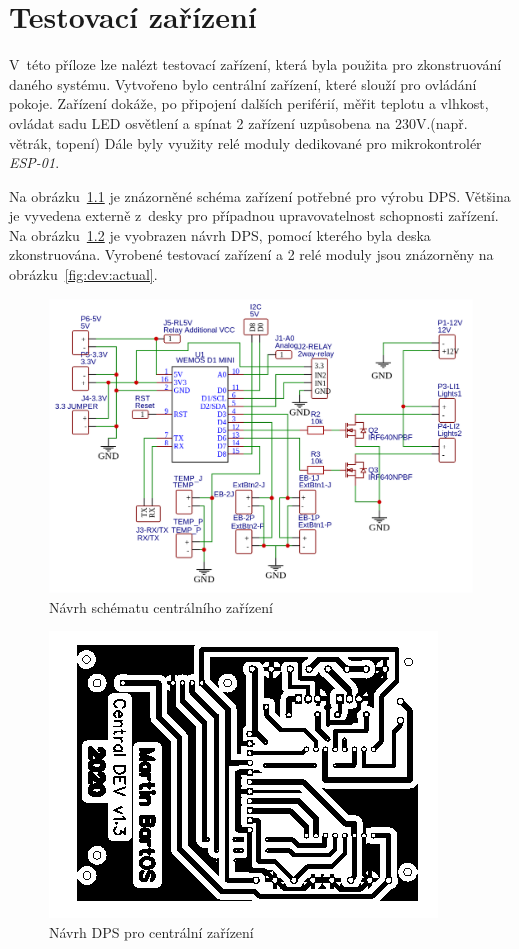 \chapter{Testovací zařízení}
V~této příloze lze nalézt testovací zařízení, která byla použita pro zkonstruování daného systému.
Vytvořeno bylo centrální zařízení, které slouží pro ovládání pokoje.
Zařízení dokáže, po připojení dalších periférií, měřit teplotu a vlhkost, ovládat sadu LED osvětlení a spínat 2 zařízení uzpůsobena na 230V.(např. větrák, topení)
Dále byly využity relé moduly dedikované pro mikrokontrolér \emph{ESP-01}.

Na obrázku~\ref{fig:dev:schematic} je znázorněné schéma zařízení potřebné pro výrobu DPS.
Většina je vyvedena externě z~desky pro případnou upravovatelnost schopnosti zařízení.
Na obrázku~\ref{fig:dev:dps} je vyobrazen návrh DPS, pomocí kterého byla deska zkonstruována.
Vyrobené testovací zařízení a 2 relé moduly jsou znázorněny na obrázku~\ref{fig:dev:actual}.

\begin{figure}[hbt]
    \centering
    \includegraphics[width=1 \linewidth]{obrazky-figures/schematicNew.png}
    \caption{Návrh schématu centrálního zařízení}
    \label{fig:dev:schematic}
\end{figure}

\begin{figure}[hbt]
    \centering
    \includegraphics[width=0.7 \linewidth]{obrazky-figures/dps.png}
    \caption{Návrh DPS pro centrální zařízení}
    \label{fig:dev:dps}
\end{figure}

